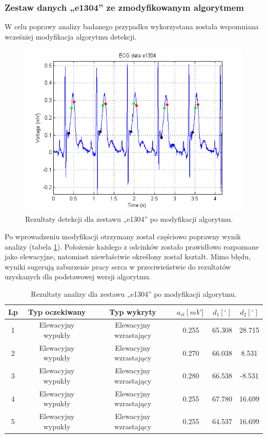\subsubsection*{Zestaw danych „e1304” ze zmodyfikowanym algorytmem}
W celu poprawy analizy badanego przypadku wykorzystana została wspomniana wcześniej modyfikacja algorytmu detekcji.
\begin{figure}[H]
	\centering
	\includegraphics[width=1\textwidth]{ST_INTERVAL/img/ST_zestawE1304mod.png}
	\caption{Rezultaty detekcji dla zestawu „e1304” po modyfikacji algorytmu.}
	\label{fig:ST_zestawE1304mod}
\end{figure}
Po wprowadzeniu modyfikacji otrzymany został częściowo poprawny wynik analizy (tabela \ref{tab:ST_zestawE1304mod}). Położenie każdego z odcinków zostało prawidłowo rozpoznane jako elewacyjne, natomiast niewłaściwie określony został kształt. Mimo błędu, wyniki sugerują zaburzenie pracy serca w przeciwieństwie do rezultatów uzyskanych dla podstawowej wersji algorytmu.
\begin{table}[H]
	\centering
	\caption{Rezultaty analizy dla zestawu „e1304” po modyfikacji algorytmu.}
	\label{tab:ST_zestawE1304mod}
	\begin{tabular}{|c|c|c|c|c|c|}
	\hline
	Lp & Typ oczekiwany & Typ wykryty & $ a_{st} [mV] $ & $ d_1 [^\circ] $ & $ d_2 [^\circ] $ \\ \hline
	1	&	Elewacyjny wypukły	&	Elewacyjny wzrastający	&	0.255	&	65.308	&	28.715	\\ \hline
	2	&	Elewacyjny wypukły	&	Elewacyjny wzrastający	&	0.270	&	66.038	&	8.531	\\ \hline
	3	&	Elewacyjny wypukły	&	Elewacyjny wzrastający	&	0.280	&	66.538	&	-8.531	\\ \hline
	4	&	Elewacyjny wypukły	&	Elewacyjny wzrastający	&	0.255	&	67.780	&	16.699	\\ \hline
	5	&	Elewacyjny wypukły	&	Elewacyjny wzrastający	&	0.255	&	64.537	&	16.699	\\ \hline
	\end{tabular}
\end{table}

